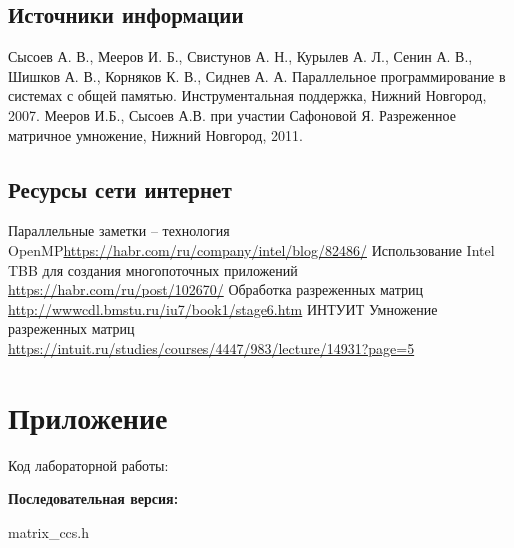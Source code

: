 \documentclass{report}
\begin{document}
\begin{thebibliography}{1}
\subsection*{Источники информации}
Сысоев А. В., Мееров И. Б., Свистунов А. Н., Курылев А. Л., Сенин А. В., Шишков А. В., Корняков К. В.,
Сиднев А. А. Параллельное программирование в системах с общей
памятью. Инструментальная поддержка, Нижний Новгород, 2007.
Мееров И.Б., Сысоев А.В. при участии Сафоновой Я. Разреженное матричное умножение, Нижний Новгород, 2011.
\subsection*{Ресурсы сети интернет}
Параллельные заметки – технология OpenMP\newline \url{https://habr.com/ru/company/intel/blog/82486/}
Использование Intel TBB для создания многопоточных приложений \newline \url{https://habr.com/ru/post/102670/}
Обработка разреженных матриц \\
\url{http://wwwcdl.bmstu.ru/iu7/book1/stage6.htm}
ИНТУИТ Умножение разреженных матриц\\
\url{https://intuit.ru/studies/courses/4447/983/lecture/14931?page=5}
\end{thebibliography}
\newpage

\section*{Приложение}
Код лабораторной работы:

\textbf{Последовательная версия:}

matrix\_ccs.h
\end{document}

